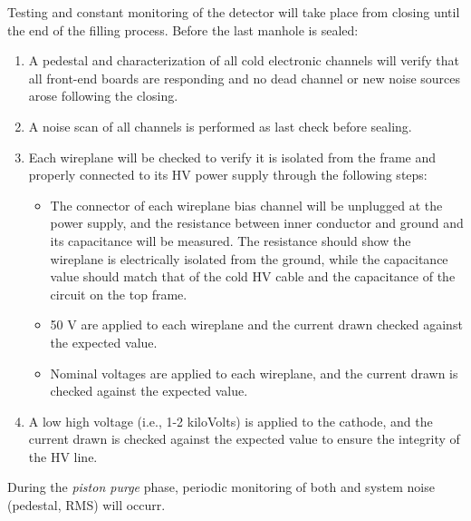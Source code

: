 Testing and constant monitoring of the detector will take place from  closing until the end of the filling process.
Before the last manhole is sealed:
\begin{enumerate}

    \item A pedestal and  characterization of all cold electronic channels will verify that all  front-end boards are responding and no dead channel or new noise sources arose following the  closing.
    
    \item A noise scan of all  channels is performed as last check before sealing.

    \item Each  wireplane will be checked to verify it is isolated from the  frame and properly connected to its HV power supply through the following steps:
    
\begin{itemize}

    \item The  connector of each wireplane bias channel will be unplugged at the power supply, and the resistance between inner conductor and ground and its capacitance will be measured. The resistance should show the wireplane is electrically isolated from the ground, while the capacitance value should match that of the cold HV cable and the capacitance of the circuit on the  top frame.

    \item 50 V are applied to each wireplane and the current drawn checked against the expected value.
    
    \item Nominal voltages are applied to each wireplane, and the current drawn is checked against the expected value. 
    
\end{itemize}

    \item A low high voltage (i.e., 1-2 kiloVolts) is applied to the cathode, and the current drawn is checked against the expected value to ensure the integrity of the HV line.

\end{enumerate}

During the \textit{piston purge} phase, periodic monitoring of both   and  system noise (pedestal, RMS) will occurr.

